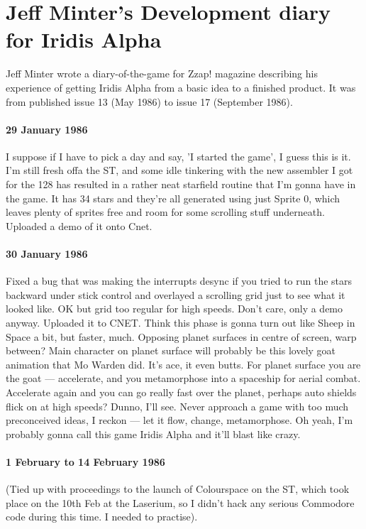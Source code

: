 \chapter{Jeff Minter's Development diary for Iridis Alpha}

Jeff Minter wrote a diary-of-the-game for Zzap! magazine describing his experience of getting Iridis Alpha from a basic idea
to a finished product. It was from published issue 13 (May 1986) to issue 17 (September 1986).

\subsubsection{29 January 1986}
I suppose if I have to pick a day and say, 'I started the game', I guess this is it. I'm still fresh offa the ST, and some idle tinkering with the new assembler I got for the 128 has resulted in a rather neat starfield routine that I'm gonna have in the game. It has 34 stars and they're all generated using just Sprite 0, which leaves plenty of sprites free and room for some scrolling stuff underneath. Uploaded a demo of it onto Cnet.

\subsubsection{30 January 1986}
Fixed a bug that was making the interrupts desync if you tried to run the stars backward under stick control and overlayed a scrolling grid just to see what it looked like. OK but grid too regular for high speeds. Don't care, only a demo anyway. Uploaded it to CNET. Think this phase is gonna turn out like Sheep in Space a bit, but faster, much. Opposing planet surfaces in centre of screen, warp between? Main character on planet surface will probably be this lovely goat animation that Mo Warden did. It's ace, it even butts. For planet surface you are the goat — accelerate, and you metamorphose into a spaceship for aerial combat. Accelerate again and you can go really fast over the planet, perhaps auto shields flick on at high speeds? Dunno, I'll see. Never approach a game with too much preconceived ideas, I reckon — let it flow, change, metamorphose. Oh yeah, I'm probably gonna call this game Iridis Alpha and it'll blast like crazy.

\subsubsection{1 February to 14 February 1986}
(Tied up with proceedings to the launch of Colourspace on the ST, which took place on the 10th Feb at the Laserium, so I didn't hack any serious Commodore code during this time. I needed to practise).

